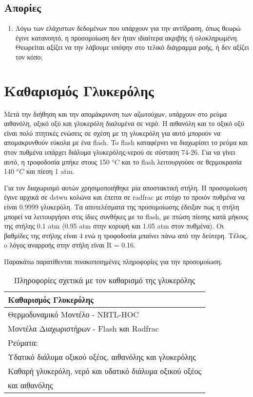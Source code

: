 \documentclass[11pt]{article}
\begin{document}
\subsection{Απορίες}
\label{sec:orgd395b45}
\begin{enumerate}
\item Λόγω των ελάχιστων δεδομένων που υπάρχουν για την αντίδραση, όπως θεωρώ έγινε κατανοητό, η προσομοίωση δεν ήταν ιδιαίτερα ακριβής ή ολοκληρωμένη. Θεωρείται αξίζει να την λάβουμε υπόψην στο τελικό διάγραμμα ροής, ή δεν αξίζει τον κόπο;
\end{enumerate}

\section{Καθαρισμός Γλυκερόλης}
\label{sec:org46be34a}
Μετά την διήθηση και την απομάκρυνση των αζωτούχων, υπάρχουν στο ρεύμα αιθανόλη, οξικό οξύ και γλυκερόλη διαλυμένα σε νερό. Η αιθανόλη και το οξικό οξύ είναι πολύ πτητικές ενώσεις σε σχέση με τη γλυκερόλη για αυτό μπορούν να απομακρυνθούν εύκολα με ένα flash. To flash καταφέρνει να διαχωρίσει το ρεύμα και στον πυθμένα υπάρχει διάλυμα γλυκερόλης-νερού σε σύσταση 74-26. Για να γίνει αυτό, η τροφοδοσία μπήκε στους 150 \(^oC\) και το flash λειτουργούσε σε θερμοκρασία 140 \(^oC\) και πίεση 1 atm.

Για τον διαχωρισμό αυτών χρησιμοποιήθηκε μία αποστακτική στήλη. Η προσομοίωση έγινε αρχικά σε dstwu κολώνα και έπειτα σε radfrac με στόχο το προιόν πυθμένα να είναι 0.9999 γλυκερόλη. Τα αποτελέσματα της προσομοίωσης έδειξαν πως η στήλη μπορεί να λειτουργήσει στις ίδιες συνθήκες με το flash, με πτώση πίεσης κατά μήκους της στήλης 0.1 atm (0.95 atm στην κορυφή και 1.05 atm στον πυθμένα). Οι βαθμίδες της στήλης είναι 4 ενώ η τροφοδοσία μπαίνει πάνω από την δεύτερη. Τέλος, o λόγος αναρροής στην στήλη είναι R = 0.16.

Παρακάτω παρατίθενται πινακοποιημένες πληροφορίες για την προσομοίωση.

\begin{table}[htbp]
\caption{Πληροφορίες σχετικά με τον καθαρισμό της γλυκερόλης}
\centering
\begin{tabular}{l}
\hline
Καθαρισμός Γλυκερόλης\\
\hline
Θερμοδυναμικό Μοντέλο - NRTL-HOC\\
Μοντέλα Διαχωριστήρων - Flash και Radfrac\\
Ρεύματα:\\
\hline
Υδατικό διάλυμα οξικού οξέος, αιθανόλης και γλυκερόλης\\
\hline
Καθαρή γλυκερόλη, νερό και υδατικό διάλυμα οξικού οξέος\\
και αιθανόλης\\
\hline
\end{tabular}
\end{table}
\end{document}
